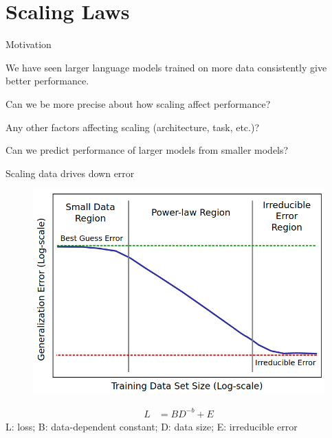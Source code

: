 \documentclass[usenames,dvipsnames,notes,11pt,aspectratio=169,hyperref={colorlinks=true, linkcolor=blue}]{beamer}
\begin{document}
\section{Scaling Laws}

\begin{frame}
    {Motivation}
    \begin{wideitemize}
        \item We have seen larger language models trained on more data consistently give better performance.
        \item Can we be more precise about how scaling affect performance?
        \item Any other factors affecting scaling (architecture, task, etc.)?
        \item Can we predict performance of larger models from smaller models?
    \end{wideitemize}
\end{frame}

\begin{frame}
    {Scaling data drives down error}
    \begin{figure}
        \includegraphics[height=0.5\textheight]{figures/scaling-law}
        \caption{}
    \end{figure}
    \begin{align}
        L &= BD^{-b} + E 
    \end{align}
    L: loss; B: data-dependent constant; D: data size; E: irreducible error
\end{frame}
\end{document}
